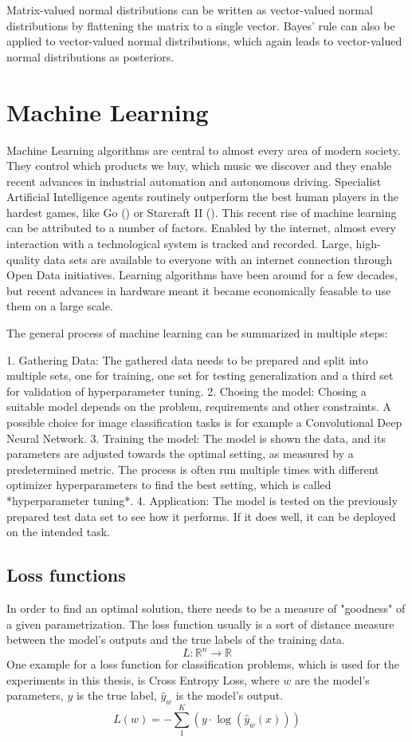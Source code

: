 \documentclass[twoside,12pt,a4paper]{report}
\begin{document}
Matrix-valued normal distributions can be written as vector-valued normal distributions by flattening the matrix to a single vector.
Bayes' rule can also be applied to vector-valued normal distributions, which again leads to vector-valued normal distributions as posteriors.

\section{Machine Learning}
Machine Learning algorithms are central to almost every area of modern society. They control which products we buy, which music we discover and they enable recent advances in industrial automation and autonomous driving. Specialist Artificial Intelligence agents routinely outperform the best human players in the hardest games, like Go (\cite{gibney2016google}) or Starcraft II (\cite{vinyals2019alphastar}).
This recent rise of machine learning can be attributed to a number of factors. Enabled by the internet, almost every interaction with a technological system is tracked and recorded. Large, high-quality data sets are available to everyone with an internet connection through Open Data initiatives.
Learning algorithms have been around for a few decades, but recent advances in hardware meant it became economically feasable to use them on a large scale.

The general process of machine learning can be summarized in multiple steps:
\\

\begin{markdown}
1. Gathering Data: The gathered data needs to be prepared and split into multiple sets, one for training, one set for testing generalization and a third set for validation of hyperparameter tuning.
2. Chosing the model: Chosing a suitable model depends on the problem, requirements and other constraints. A possible choice for image classification tasks is for example a Convolutional Deep Neural Network.
3. Training the model: The model is shown the data, and its parameters are adjusted towards the optimal setting, as measured by a predetermined metric. The process is often run multiple times with different optimizer hyperparameters to find the best setting, which is called *hyperparameter tuning*.
4. Application: The model is tested on the previously prepared test data set to see how it performs. If it does well, it can be deployed on the intended task.
\end{markdown}

\subsection{Loss functions}
In order to find an optimal solution, there needs to be a measure of "goodness" of a given parametrization.
The loss function usually is a sort of distance measure between the model's outputs and the true labels of the training data.
$$L: \mathbb{R}^n \rightarrow \mathbb{R}$$
One example for a loss function for classification problems, which is used for the experiments in this thesis, is Cross Entropy Loss, where $w$ are the model's parameters, $y$ is the true label, $\hat{y}_w$ is the model's output.
$$L(w) = - \sum_{1}^{K}(y \cdot \log(\hat{y}_w(x)))$$
\end{document}
